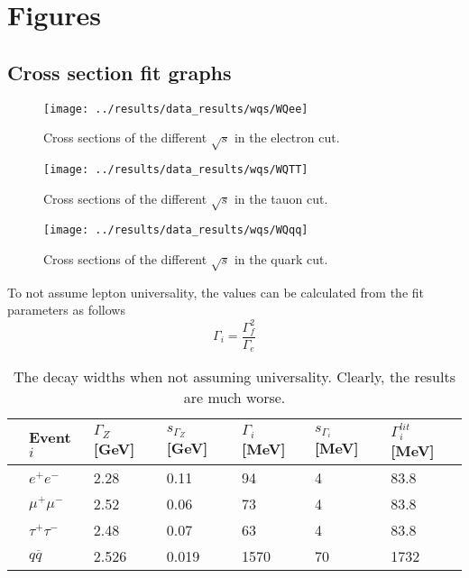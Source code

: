 \section{Figures}
\subsection{Cross section fit graphs}
\begin{figure}[H]
	\centering
	\texttt{[image: ../results/data\_results/wqs/WQee]}
	\caption[Cross sections for electron cut]{Cross sections of the different $\sqrt{s}$ in the electron cut.}
	\label{fig:WQee}
\end{figure}

\begin{figure}[H]
	\centering
	\texttt{[image: ../results/data\_results/wqs/WQTT]}
	\caption[Cross sections for tauon cut]{Cross sections of the different $\sqrt{s}$ in the tauon cut.}
	\label{fig:WQTT}
\end{figure}

\begin{figure}[H]
	\centering
	\texttt{[image: ../results/data\_results/wqs/WQqq]}
	\caption[Cross sections for quark cut]{Cross sections of the different $\sqrt{s}$ in the quark cut.}
	\label{fig:WQqq}
\end{figure}

To not assume lepton universality, the values can be calculated from the fit parameters as follows
\begin{equation*}
	\Gamma_i=\frac{\Gamma_f^2}{\Gamma_e}
\end{equation*}
\begin{table}[h]\centering
	\begin{tabular}{@{}lllllll@{}}
		\toprule
		&Event $i$&$\Gamma_{Z}$ [GeV]&$s_{\Gamma_{Z}}$ [GeV]&$\Gamma_i$ [MeV]&$s_{\Gamma_i}$ [MeV]&$\Gamma_i^{lit}$ [MeV]\\
		\midrule
		&$e^+e^-$&2.28&0.11&94&4&83.8\\
		&$\mu^+\mu^-$&2.52&0.06&73&4&83.8\\
		&$\tau^+\tau^-$&2.48&0.07&63&4&83.8\\
		&$q\overline{q}$&2.526&0.019&1570&70&1732\\
		\bottomrule
	\end{tabular}
	\caption[Decay widths not assumint universality]{The decay widths when not assuming universality. Clearly, the results are much worse.}
	\label{tb:appendix:decaywidthsnouniv}
\end{table}	